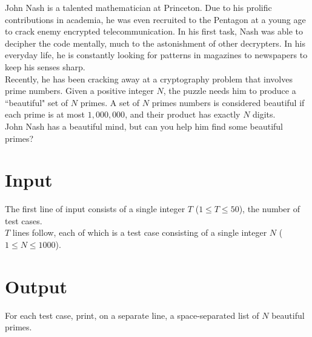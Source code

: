 
\noindent John Nash is a talented mathematician at Princeton. Due to his prolific contributions in academia, he was even recruited to the Pentagon at a young age to crack enemy encrypted telecommunication. In his first task, Nash was able to decipher the code mentally, much to the astonishment of other decrypters. In his everyday life, he is constantly looking for patterns in magazines to newspapers to keep his senses sharp.\\

Recently, he has been cracking away at a cryptography problem that involves prime numbers. Given a positive integer $N$, the puzzle needs him to produce a ``beautiful" set of $N$ primes. A set of $N$ primes numbers is considered beautiful if each prime is at most $1,000,000$, and their product has exactly $N$ digits.\\

John Nash has a beautiful mind, but can you help him find some beautiful primes?

\section*{Input}
The first line of input consists of a single integer $T$ ($1 \leq T \leq 50$), the number of test cases.\\
$T$ lines follow, each of which is a test case consisting of a single integer $N$ ($1 \leq N \leq 1000$).

\section*{Output}
For each test case, print, on a separate line, a space-separated list of $N$ beautiful primes.
